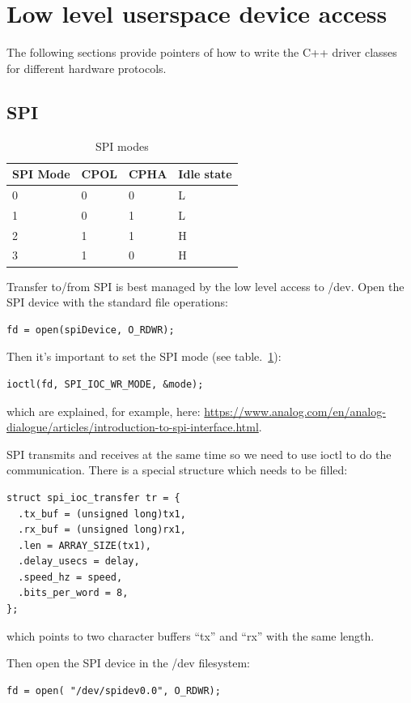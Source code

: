 \documentclass[12pt]{report}
\begin{document}
\section{Low level userspace device access}
The following sections provide pointers of how to write
the C++ driver classes for different hardware protocols.

\subsection{SPI}
\begin{table}[!ht]
  \begin{center}
  \caption{SPI modes\label{spimodes}}
  \begin{tabular}{l|l|l|l}
    SPI Mode & 	CPOL & 	CPHA & Idle state \\
    \hline
    0& 	0&	0& 	L \\
    1& 	0&	1& 	L \\
    2& 	1&	1& 	H \\
    3& 	1&	0& 	H \\
  \end{tabular}
  \end{center}
\end{table}
Transfer to/from SPI is best managed by the low level access to /dev.
Open the SPI device with the standard file operations:
\begin{verbatim}
fd = open(spiDevice, O_RDWR);
\end{verbatim}

Then it's important to set the SPI mode (see table.~\ref{spimodes}):
\begin{verbatim}
ioctl(fd, SPI_IOC_WR_MODE, &mode);
\end{verbatim}
which are explained, for example, here:
\url{https://www.analog.com/en/analog-dialogue/articles/introduction-to-spi-interface.html}.

SPI transmits and receives at the same time so we need to
use ioctl to do the communication. There is a special structure
which needs to be filled:
\begin{verbatim}
struct spi_ioc_transfer tr = {
  .tx_buf = (unsigned long)tx1,
  .rx_buf = (unsigned long)rx1,
  .len = ARRAY_SIZE(tx1),
  .delay_usecs = delay,
  .speed_hz = speed,
  .bits_per_word = 8,
};
\end{verbatim}
which points to two character buffers ``tx'' and ``rx'' with the
same length.

Then open the SPI device in the /dev filesystem:
\begin{verbatim}
fd = open( "/dev/spidev0.0", O_RDWR);
\end{verbatim}
\end{document}
